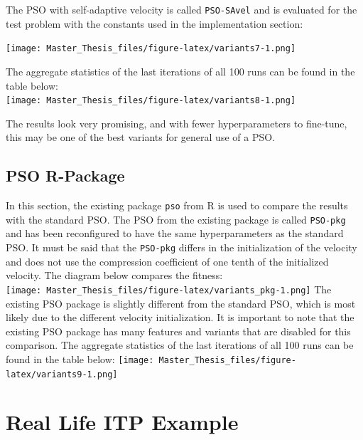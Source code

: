 \documentclass[
  oneside]{book}
\begin{document}
The PSO with self-adaptive velocity is called \texttt{PSO-SAvel} and is evaluated for the test problem with the constants used in the implementation section:

\texttt{[image: Master\_Thesis\_files/figure-latex/variants7-1.png]}

The aggregate statistics of the last iterations of all 100 runs can be found in the table below:\\
\vspace{-0.1cm}
\texttt{[image: Master\_Thesis\_files/figure-latex/variants8-1.png]}

The results look very promising, and with fewer hyperparameters to fine-tune, this may be one of the best variants for general use of a PSO.

\hypertarget{pso-r-package}{%
\section{PSO R-Package}\label{pso-r-package}}

In this section, the existing package \texttt{pso} from R is used to compare the results with the standard PSO. The PSO from the existing package is called \texttt{PSO-pkg} and has been reconfigured to have the same hyperparameters as the standard PSO. It must be said that the \texttt{PSO-pkg} differs in the initialization of the velocity and does not use the compression coefficient of one tenth of the initialized velocity. The diagram below compares the fitness:\\
\texttt{[image: Master\_Thesis\_files/figure-latex/variants\_pkg-1.png]}
The existing PSO package is slightly different from the standard PSO, which is most likely due to the different velocity initialization. It is important to note that the existing PSO package has many features and variants that are disabled for this comparison.
The aggregate statistics of the last iterations of all 100 runs can be found in the table below:
\vspace{-0.1cm}
\texttt{[image: Master\_Thesis\_files/figure-latex/variants9-1.png]}

\hypertarget{real-life-itp-example}{%
\chapter{Real Life ITP Example}\label{real-life-itp-example}}
\end{document}
